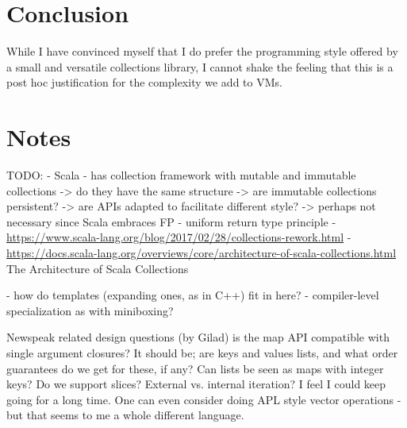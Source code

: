 \documentclass[sigconf, 10pt]{acmart}
\begin{document}
\section{Conclusion}



While I have convinced myself
that I do prefer the programming style offered
by a small and versatile collections library,
I cannot shake the feeling
that this is a post hoc justification
for the complexity we add to VMs.

\section{Notes}

\begin{note}
TODO:
- Scala
  - has collection framework with mutable and immutable collections
    -> do they have the same structure 
    -> are immutable collections persistent?
    -> are APIs adapted to facilitate different style?
      -> perhaps not necessary since Scala embraces FP
  - uniform return type principle
  - \url{https://www.scala-lang.org/blog/2017/02/28/collections-rework.html}
 - \url{https://docs.scala-lang.org/overviews/core/architecture-of-scala-collections.html} 
   The Architecture of Scala Collections  


- how do templates (expanding ones, as in C++) fit in here?
- compiler-level specialization as with miniboxing?

  
Newspeak related design questions (by Gilad)
is the map API compatible with single argument closures? It should be; are keys and values lists, and what order guarantees do we get for these, if any? Can lists be seen as maps with integer keys? Do we support slices? External vs. internal iteration? I feel I could keep going for a long time. One can even consider doing APL style vector operations - but that seems to me a whole different language.





\end{note} 






\end{document}
